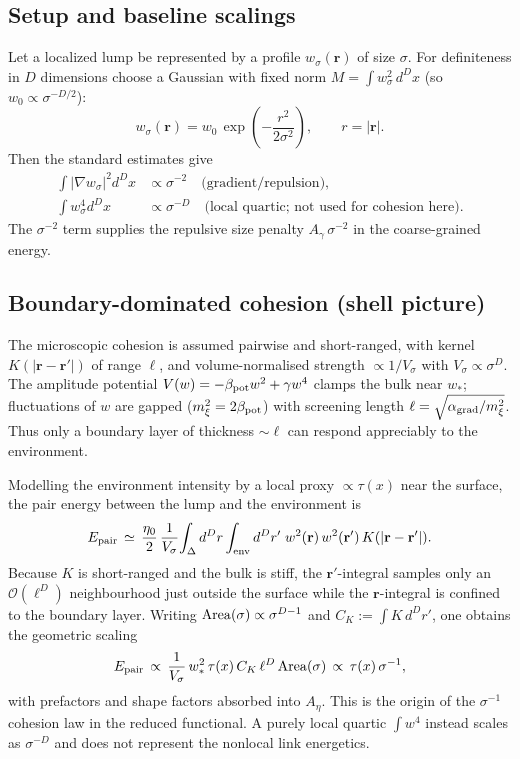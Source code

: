 \documentclass[11pt]{article}
\begin{document}
\subsection*{Setup and baseline scalings}
Let a localized lump be represented by a profile $w_\sigma(\mathbf r)$ of size $\sigma$. For definiteness in $D$ dimensions choose a Gaussian with fixed norm $M=\int w_\sigma^2\,d^D x$ (so $w_0\propto \sigma^{-D/2}$):
\begin{equation}
  w_\sigma(\mathbf r) = w_0\,\exp\!\left(-\frac{r^2}{2\sigma^2}\right),\qquad r=|\mathbf r|.
\end{equation}
Then the standard estimates give
\begin{align}
  \int |\nabla w_\sigma|^2 d^D x &\propto \sigma^{-2} \quad \text{(gradient/repulsion)},\\
  \int w_\sigma^4 d^D x &\propto \sigma^{-D} \quad \text{(local quartic; not used for cohesion here)}.
\end{align}
The $\sigma^{-2}$ term supplies the repulsive size penalty $A_\gamma\,\sigma^{-2}$ in the coarse-grained energy.

\subsection*{Boundary-dominated cohesion (shell picture)}
The microscopic cohesion is assumed pairwise and short-ranged, with kernel $K(|\mathbf r-\mathbf r'|)$ of range $\ell$, and volume-normalised strength $\propto 1/V_\sigma$ with $V_\sigma\propto\sigma^D$. The amplitude potential $V(w)=-\beta_{\rm pot}w^2+\gamma w^4$ clamps the bulk near $w_*$; fluctuations of $w$ are gapped ($m_\xi^2=2\beta_{\rm pot}$) with screening length $\ell=\sqrt{\alpha_{\rm grad}/m_\xi^2}$. Thus only a boundary layer of thickness $\sim\ell$ can respond appreciably to the environment.

Modelling the environment intensity by a local proxy $\propto \tau(x)$ near the surface, the pair energy between the lump and the environment is
\begin{equation}
  E_{\rm pair} \,\simeq\, \frac{\eta_0}{2}\,\frac{1}{V_\sigma}\! \int_{\Delta} d^D r \int_{\text{env}} d^D r'\; w^2(\mathbf r)\,w^2(\mathbf r')\,K(|\mathbf r-\mathbf r'|).
\end{equation}
Because $K$ is short-ranged and the bulk is stiff, the $\mathbf r'$-integral samples only an $\mathcal O(\ell^D)$ neighbourhood just outside the surface while the $\mathbf r$-integral is confined to the boundary layer. Writing ${\rm Area}(\sigma)\propto\sigma^{D-1}$ and $C_K:=\int K\,d^D r'$, one obtains the geometric scaling
\begin{equation}
  E_{\rm pair} \,\propto\, \frac{1}{V_\sigma}\, w_*^2\,\tau(x)\,C_K\,\ell^D\, {\rm Area}(\sigma) \,\propto\, \tau(x)\,\sigma^{-1},
\end{equation}
with prefactors and shape factors absorbed into $A_\eta$. This is the origin of the $\sigma^{-1}$ cohesion law in the reduced functional. A purely local quartic $\int w^4$ instead scales as $\sigma^{-D}$ and does not represent the nonlocal link energetics.
\end{document}
